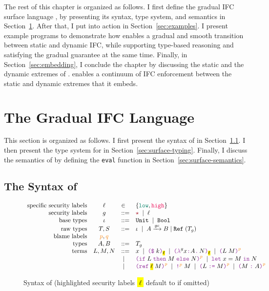 The rest of this chapter is organized as follows. I first define the gradual IFC
surface language \Surface, by presenting its syntax, type system, and semantics
in Section~\ref{sec:surface-def}. After that, I put \Surface into action in
Section~\ref{sec:examples}. I present example programs to demonstrate how
\Surface enables a gradual and smooth transition between static and dynamic IFC,
while supporting type-based reasoning and satisfying the gradual guarantee at
the same time. Finally, in Section~\ref{sec:embedding}, I conclude the chapter
by discussing the static and the dynamic extremes of \Surface. \Surface enables
a continuum of IFC enforcement between the static and dynamic extremes that it
embeds.

\section{The Gradual IFC Language \Surface}
\label{sec:surface-def}

This section is organized as follows. I first present the syntax of \Surface in
Section~\ref{sec:surface-syntax}. I then present the type system for \Surface in
Section~\ref{sec:surface-typing}. Finally, I discuss the semantics of \Surface
by defining the \texttt{eval} function in Section~\ref{sec:surface-semantics}.

\subsection{The Syntax of \Surface}
\label{sec:surface-syntax}


\begin{figure}[tbp]
\raggedright
  {\small
  \[
  \begin{array}{rcll}
    \text{specific security labels} & \ell & \in & \{ \low , \high \} \\
    \text{security labels}  & g    & ::= & \unk \MID \ell \\
    \text{base types}               & \iota     & ::= & \Unit \MID \Bool \\
    \text{raw types}                & T, S      & ::= & \iota \MID \Fun{A}{\gc}{B} \mid \Refer{(T_g)} \\
    \text{blame labels}         & \bl{p}, \bl{q}     &      & \\
    \text{types}                    & A, B      & ::= & T_g \\
    \text{terms}                & L , M , N & ::=  & x \MID \const{k}{\text{\hl{$\ell$}}} \MID \lam{g}{x}{A}{N}{\text{\hl{$\ell$}}} \MID \app{L}{M}{p} \\
    &                                       & \MID & \ifexp{L}{M}{N}{p} \MID \letexp{x}{M}{N} \\
    &                                       & \MID & \refexp{\text{\hl{$\ell$}}}{M}{p} \MID \deref{M}{p} \MID \assign{L}{M}{p} \MID \ann{M}{A}{p}
  \end{array}
  \]}
  \caption{Syntax of \Surface (highlighted security labels \hl{$\ell$} default to \low if omitted)}
  \label{fig:surface-syntax}
\end{figure}

